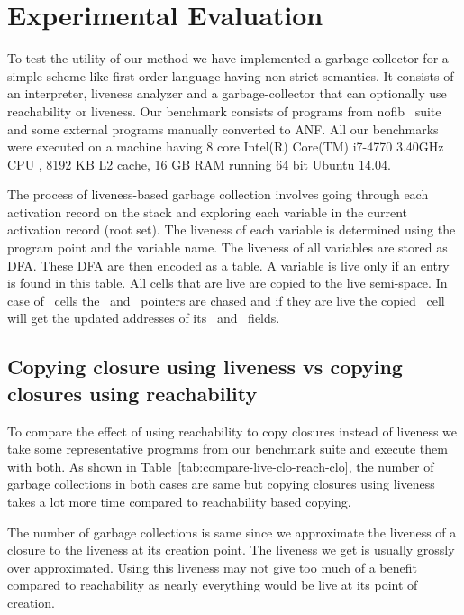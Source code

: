 \documentclass[9pt]{sigplanconf}
\begin{document}
\section{Experimental Evaluation}
\label{sec:experiments}
To   test  the   utility  of   our  method   we  have   implemented  a
garbage-collector for a simple scheme-like first order language having
non-strict semantics. It consists of an interpreter, liveness analyzer
and  a  garbage-collector  that  can optionally  use  reachability  or
liveness.  Our benchmark consists  of programs from nofib~\cite{nofib}
suite and some  external programs manually converted to  ANF.  All our
benchmarks were executed on a  machine having 8 core Intel(R) Core(TM)
i7-4770 3.40GHz  CPU ,  8192 KB  L2 cache,  16 GB  RAM running  64 bit
Ubuntu 14.04.


The process of liveness-based garbage collection involves going through 
each activation record on the stack and exploring each variable in the 
current activation record (root set). The liveness of each variable is 
determined using the program point and the variable name. The liveness 
of all variables are stored as DFA. These DFA are then encoded as a 
table. A variable is live only if an entry is found in this table.
All cells that are live are copied to the live semi-space. In case of 
\CONS\ cells the \CAR\ and \CDR\ pointers are chased and if they are 
live the copied \CONS\ cell will get the updated addresses of its 
\CAR\ and \CDR\ fields.

\subsection{Copying closure using liveness vs copying closures using reachability}\label{sec:strategies}

To compare the  effect of using reachability to  copy closures instead
of liveness  we take some  representative programs from  our benchmark
suite    and    execute    them    with    both.     As    shown    in
Table~\ref{tab:compare-live-clo-reach-clo},  the   number  of  garbage
collections in both cases are same but copying closures using liveness
takes a lot more time compared to reachability based copying.

The number  of garbage  collections is same  since we  approximate the
liveness of  a closure  to the  liveness at  its creation  point.  The
liveness  we get  is usually  grossly over  approximated.  Using  this
liveness may not  give too much of a benefit  compared to reachability
as nearly everything would be live at its point of creation.
\end{document}
